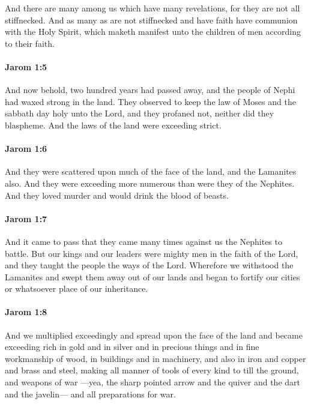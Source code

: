 			And there are many among us which have many revelations,
			for they are not all stiffnecked.
			And as many as are not stiffnecked and have faith
			have communion with the Holy Spirit,
			which maketh manifest unto the children of men according to their faith.

		\paragraph{Jarom 1:5} %
			\label{JAROM-1-5}

			And now behold, two hundred years had passed away,
			and the people of Nephi had waxed strong in the land.
			They observed to keep the law of Moses
			and the sabbath day holy unto the Lord,
			and they profaned not, neither did they blaspheme.
			And the laws of the land were exceeding strict.

		\paragraph{Jarom 1:6} %
			\label{JAROM-1-6}

			And they were scattered upon much of the face of the land,
			and the Lamanites also.
			And they were exceeding more numerous than were they of the Nephites.
			And they loved murder and would drink the blood of beasts.

		\paragraph{Jarom 1:7} %
			\label{JAROM-1-7}

			And it came to pass that they came many times against us the Nephites to battle.
			But our kings and our leaders were mighty men in the faith of the Lord,
			and they taught the people the ways of the Lord.
			Wherefore we withstood the Lamanites
			and swept them away out of our lands
			and began to fortify our cities or whatsoever place of our inheritance.

		\paragraph{Jarom 1:8} %
			\label{JAROM-1-8}

			And we multiplied exceedingly and spread upon the face of the land
			and became exceeding rich in gold and in silver and in precious things
			and in fine workmanship of wood, in buildings and in machinery,
			and also in iron and copper and brass and steel,
			making all manner of tools of every kind to till the ground,
			and weapons of war
			—yea, the sharp pointed arrow and the quiver and the dart and the javelin—
			and all preparations for war.


